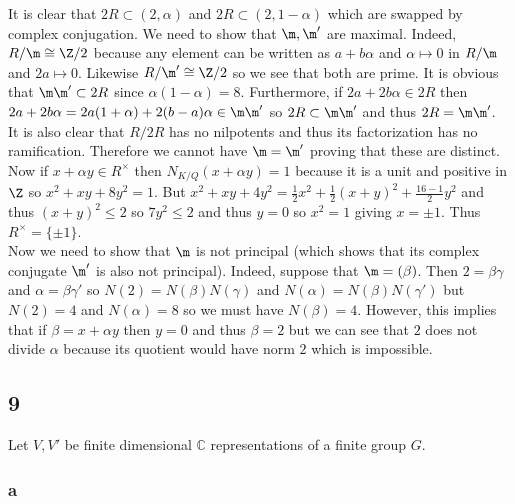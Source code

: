 \documentclass[12pt]{article}
\renewcommand{\C}{\mathbb{C}}
\begin{document}
It is clear that $2 R \subset (2, \alpha)$ and $2R \subset (2, 1 - \alpha)$ which are swapped by complex conjugation. We need to show that $\m, \m'$ are maximal. Indeed, $R / \m \cong \Z / 2$ because any element can be written as $a + b \alpha$ and $\alpha \mapsto 0$ in $R / \m$ and $2a \mapsto 0$. Likewise $R / \m' \cong \Z / 2$ so we see that both are prime. It is obvious that $\m \m' \subset 2 R$ since $\alpha (1 - \alpha) = 8$. Furthermore, if $2 a + 2 b \alpha \in 2R$ then $2 a + 2 b \alpha = 2 a (1 + \alpha) + 2 (b - a) \alpha \in \m \m'$ so $2R \subset \m \m'$ and thus $2 R = \m \m'$. 
\bigskip\\
It is also clear that $R / 2R$ has no nilpotents and thus its factorization has no ramification. Therefore we cannot have $\m = \m'$ proving that these are distinct.
\bigskip\\
Now if $x + \alpha y \in R^\times$ then $N_{K/Q}(x  + \alpha y) = 1$ because it is a unit and positive in $\Z$ so $x^2 + x y + 8 y^2 = 1$. But $x^2 + xy + 4 y^2 = \tfrac{1}{2} x^2 + \tfrac{1}{2}(x + y)^2 + \tfrac{16-1}{2} y^2$ and thus $(x + y)^2 \le 2$ so $7 y^2 \le 2$ and thus $y = 0$ so $x^2 = 1$ giving $x = \pm 1$. Thus $R^\times = \{ \pm 1 \}$.
\bigskip\\
Now we need to show that $\m$ is not principal (which shows that its complex conjugate $\m'$ is also not principal). Indeed, suppose that $\m = (\beta)$. Then $2 = \beta \gamma$ and $\alpha = \beta \gamma'$ so $N(2) = N(\beta) N(\gamma)$ and $N(\alpha) = N(\beta) N(\gamma')$ but $N(2) = 4$ and $N(\alpha) = 8$ so we must have $N(\beta) = 4$. However, this implies that if $\beta = x + \alpha y$ then $y = 0$ and thus $\beta = 2$ but we can see that $2$ does not divide $\alpha$ because its quotient would have norm $2$ which is impossible. 

\subsection{9}

Let $V, V'$ be finite dimensional $\C$ representations of a finite group $G$.

\subsubsection{a}
\end{document}
